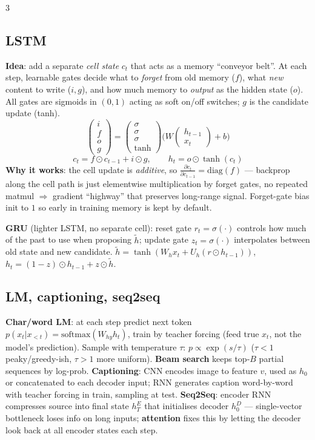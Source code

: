 \documentclass[a4paper,9pt,landscape]{scrartcl}
\newcommand{\softmax}{\mathrm{softmax}}
\newcommand{\dd}[2]{\frac{\partial #1}{\partial #2}}
\begin{document}
\begin{multicols*}{3}
\subsection{LSTM}
\textbf{Idea}: add a separate \emph{cell state} $c_t$ that acts as a memory ``conveyor belt''. At each step, learnable gates decide what to \emph{forget} from old memory ($f$), what \emph{new} content to write ($i,g$), and how much memory to \emph{output} as the hidden state ($o$). All gates are sigmoids in $(0,1)$ acting as soft on/off switches; $g$ is the candidate update (tanh).
$$\begin{pmatrix}i\\f\\o\\g\end{pmatrix}=\begin{pmatrix}\sigma\\\sigma\\\sigma\\\tanh\end{pmatrix}\!\!\Big(W\!\begin{pmatrix}h_{t-1}\\x_t\end{pmatrix}+b\Big)$$
$$c_t=f\odot c_{t-1}+i\odot g,\qquad h_t=o\odot\tanh(c_t)$$
\textbf{Why it works}: the cell update is \emph{additive}, so $\dd{c_t}{c_{t-1}}{=}\mathrm{diag}(f)$ — backprop along the cell path is just elementwise multiplication by forget gates, no repeated matmul $\Rightarrow$ gradient ``highway'' that preserves long-range signal. Forget-gate bias init to $1$ so early in training memory is kept by default.

\textbf{GRU} (lighter LSTM, no separate cell): reset gate $r_t{=}\sigma(\cdot)$ controls how much of the past to use when proposing $\tilde h$; update gate $z_t{=}\sigma(\cdot)$ interpolates between old state and new candidate.
$\tilde h=\tanh(W_h x_t+U_h(r\odot h_{t-1}))$, $h_t=(1-z)\odot h_{t-1}+z\odot\tilde h$.

\subsection{LM, captioning, seq2seq}
\textbf{Char/word LM}: at each step predict next token $p(x_t|x_{<t})=\softmax(W_{hy}h_t)$, train by teacher forcing (feed true $x_t$, not the model's prediction). Sample with temperature $\tau$: $p\propto\exp(s/\tau)$ ($\tau\!<\!1$ peaky/greedy-ish, $\tau\!>\!1$ more uniform). \textbf{Beam search} keeps top-$B$ partial sequences by log-prob.
\textbf{Captioning}: CNN encodes image to feature $v$, used as $h_0$ or concatenated to each decoder input; RNN generates caption word-by-word with teacher forcing in train, sampling at test.
\textbf{Seq2Seq}: encoder RNN compresses source into final state $h^E_T$ that initialises decoder $h^D_0$ — single-vector bottleneck loses info on long inputs; \textbf{attention} fixes this by letting the decoder look back at all encoder states each step.


\end{multicols*}
\end{document}
